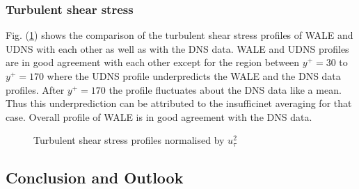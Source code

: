 \subsubsection{Turbulent shear stress}
Fig. (\ref{uvrms udns vs wale}) shows the comparison of the turbulent shear stress profiles of WALE and UDNS with each other as well as with the DNS data. WALE and UDNS profiles are in good agreement with each other except for the region between $y^+ = 30$ to $y^+ = 170$ where the UDNS profile underpredicts the WALE and the DNS data profiles. After $y^+ = 170$ the profile fluctuates about the DNS data like a mean. Thus this underprediction can be attributed to the insufficinet averaging for that case. Overall profile of WALE is in good agreement with the DNS data. 
%
\begin{figure}[h!]
\begin{minipage}[b]{0.5\textwidth}
\end{minipage}
%
\begin{minipage}[b]{0.5\textwidth}
\end{minipage}
\caption{Turbulent shear stress profiles normalised by $u_\tau^2$}
\label{uvrms udns vs wale}
\end{figure} 
%

\subsection{Conclusion and Outlook}